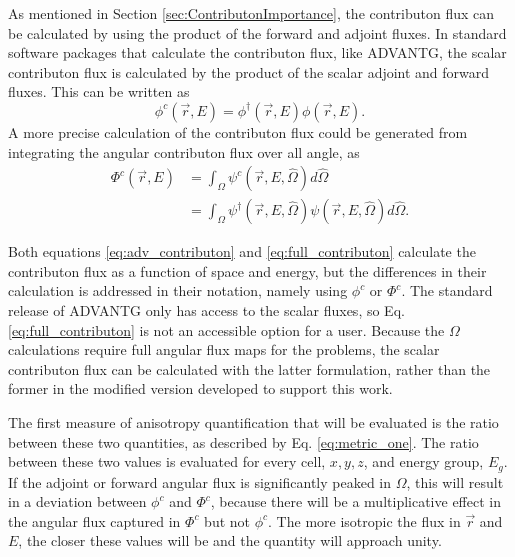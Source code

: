 As mentioned in Section \ref{sec:ContributonImportance}, the
contributon flux can be calculated by using
the product of the forward and adjoint fluxes. In standard software packages
that calculate the contributon flux, like ADVANTG, the scalar contributon flux is calculated by the product
of the scalar adjoint and forward fluxes. This can be written as
%
\begin{equation}
  \phi^{c}(\vec {r} ,E)  = \phi^{\dagger}(\vec {r} ,E)\phi(\vec {r} ,E) .
\label{eq:adv_contributon}
\end{equation}
%
A more precise calculation of the contributon flux could be generated from
integrating the angular contributon flux over all angle, as
%
\begin{equation}
  \begin{split}
    \Phi^{c}(\vec {r} ,E)  & = \int_{\Omega}{\psi^{c}(\vec{r}, E, \hat \Omega)}
                               d\hat\Omega \\
             & = \int_{\Omega}{\psi^{\dagger}(\vec{r}, E, \hat\Omega)
                 \psi(\vec{r}, E, \hat\Omega)} d\hat\Omega .
  \end{split}
\label{eq:full_contributon}
\end{equation}

Both equations \eqref{eq:adv_contributon} and \eqref{eq:full_contributon} calculate
the contributon flux as a function of space and energy, but the
differences in their calculation is addressed in their notation, namely using
$\phi^{c}$ or $\Phi^{c}$. The standard release of ADVANTG only has
access to the scalar
fluxes, so Eq. \eqref{eq:full_contributon} is not an accessible option for a
user. Because the $\Omega$ calculations require full angular flux maps for the
problems, the scalar contributon flux can be calculated with the latter
formulation, rather than the former in the modified version developed to support
this work.

The first measure of anisotropy quantification that will be evaluated is the
ratio between these two quantities, as described by Eq. \eqref{eq:metric_one}.
The ratio between these two values is evaluated for every cell, $x,y,z$, and energy
group, $E_g$.
If the adjoint or forward angular flux is significantly
peaked in $\Omega$, this will result in a deviation between $\phi^{c}$ and
$\Phi^{c}$, because there will be a multiplicative effect in the angular flux
captured in $\Phi^{c}$ but not $\phi^{c}$. The more isotropic the
flux in $\vec{r}$ and $E$, the closer these
values will be and the quantity will approach unity.

